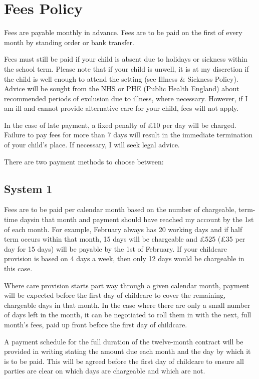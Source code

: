 

\section{Fees Policy}

Fees are payable monthly in advance. Fees are to be paid on the first of every month by standing order or bank transfer.

Fees must still be paid if your child is absent due to holidays or sickness within the school term. Please note that if your child is unwell, it is at my discretion if the child is well enough to attend the setting (see Illness \& Sickness Policy). Advice will be sought from the NHS or PHE (Public Health England) about recommended periods of exclusion due to illness, where necessary. However, if I am ill and cannot provide alternative care for your child, fees will not apply.

In the case of late payment, a fixed penalty of £10 per day will be charged. Failure to pay fees for more than 7 days will result in the immediate termination of your child's place. If necessary, I will seek legal advice.

There are two payment methods to choose between:

\subsection{System 1}

Fees are to be paid per calendar month based on the number of chargeable, term-time days\footnotemark[1]
in that month and payment should have reached my account by the 1st of each month. For example, February always has 20 working days and if half term occurs within that month, 15 days will be chargeable and £525 (£35 per day for 15 days) will be payable by the 1st of February. If your childcare provision is based on 4 days a week, then only 12 days would be chargeable in this case.

Where care provision starts part way through a given calendar month, payment will be expected before the first day of childcare to cover the remaining, chargeable days in that month. In the case where there are only a small number of days left in the month, it can be negotiated to roll them in with the next, full month's fees, paid up front before the first day of childcare.

A payment schedule for the full duration of the twelve-month contract will be provided in writing stating the amount due each month and the day by which it is to be paid. This will be agreed before the first day of childcare to ensure all parties are clear on which days are chargeable and which are not.

